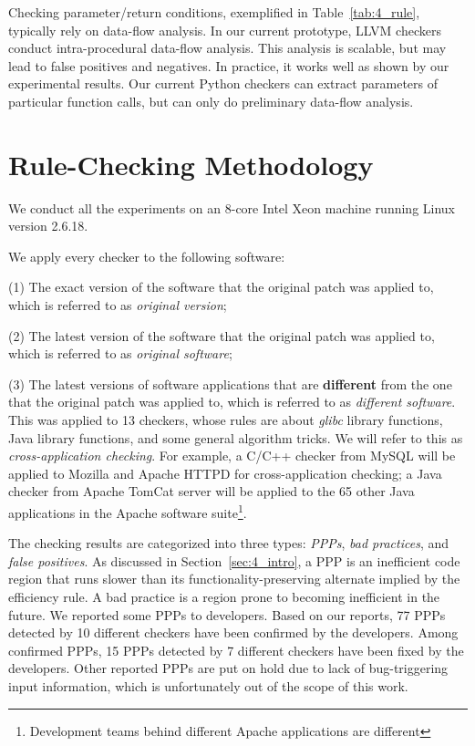 Checking parameter/return conditions, exemplified in Table~\ref{tab:4_rule}, 
typically rely on data-flow analysis. In our current prototype, LLVM checkers 
conduct intra-procedural data-flow analysis. This analysis is scalable, 
but may lead to false positives and negatives. In practice, it works
well as shown by our experimental results. Our current Python checkers can 
extract parameters of particular function calls, but can only do preliminary data-flow analysis.


\section{Rule-Checking Methodology}
\label{sec:4_detection_meth}

We conduct all the experiments on an 8-core Intel Xeon
machine running Linux version 2.6.18. 

We apply every checker to the following software: 

(1) The exact version of the software that the original patch was applied to, 
which is referred to as {\it original version}; 

(2) The latest version of 
the software that the original patch was applied to, which is referred to as 
{\it original software}; 

(3) The latest versions of 
software applications that are {\bf different} from the one that the original
patch was applied to, which is referred to as {\it different software}. 
This was applied to 13 checkers, whose rules are about {\it glibc} library
functions, Java library functions, and some general algorithm tricks. 
We will refer to this as {\it cross-application checking}.
For example, a C/C++ checker from MySQL will be applied to
Mozilla and Apache HTTPD for cross-application checking; a Java checker
from Apache TomCat server will be applied to the 65 other Java applications
in the Apache software suite\footnote{Development teams
behind different Apache applications are different}.


The checking results are categorized into three types: 
{\it PPPs}, {\it bad practices}, and {\it false positives}. 
As discussed in Section~\ref{sec:4_intro}, a PPP is an inefficient code region that
runs slower than its functionality-preserving alternate implied by
the efficiency rule. A bad practice is a region prone to becoming
inefficient in the future.
We reported some PPPs to developers.
Based on our reports,
77 PPPs detected by 10 different
checkers have been confirmed by the developers.
Among confirmed PPPs,
15 PPPs detected by 7 different checkers have been fixed by the developers. 
Other reported PPPs are put on hold due to lack of
bug-triggering input information, which is unfortunately out of the 
scope of this work.

